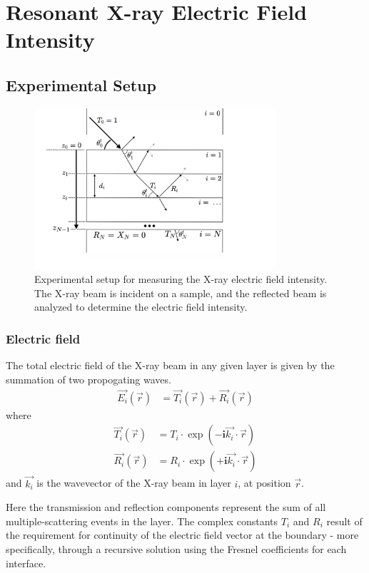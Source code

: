 \documentclass[../main.tex]{subfiles}
\begin{document}
	\chapter{Resonant X-ray Electric Field Intensity}\label{chap:07-res-XEFI}
	\section{Experimental Setup}

	\begin{figure}[H]
		\centering
		\includegraphics[width=0.8\textwidth]{resources/ch7/geometry.png}
		\caption{Experimental setup for measuring the X-ray electric field intensity. The X-ray beam is incident on a sample, and the reflected beam is analyzed to determine the electric field intensity.}
		\label{fig:experimental-setup}
	\end{figure}

	\subsection{Electric field}
	The total electric field of the X-ray beam in any given layer is given by the summation of two propogating waves.
	\begin{align}
		\vec{E_i}(\vec{r}) &= \vec{T_i}(\vec{r}) + \vec{R_i}(\vec{r})
	\end{align}
	where 
	\begin{align}
		\vec{T_i}(\vec{r}) &= T_i \cdot \exp\left(-\mathbf{i} \vec{k_{i}} \cdot \vec{r}\right) \\
		\vec{R_i}(\vec{r}) &= R_i \cdot \exp\left(+\mathbf{i} \vec{k_{i}} \cdot \vec{r}\right)
	\end{align}
	and $\vec{k_i}$ is the wavevector of the X-ray beam in layer $i$, at position $\vec{r}$.
	
	Here the transmission and reflection components represent the sum of all multiple-scattering events in the layer.
	The complex constants $T_i$ and $R_i$ result of the requirement for continuity of the electric field vector at the boundary - more specifically, through a recursive solution using the Fresnel coefficients for each interface.
\end{document}
